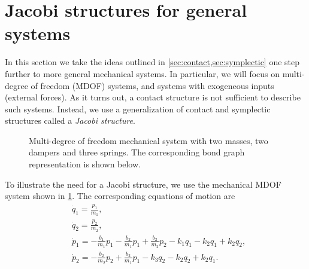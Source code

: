 \section{Jacobi structures for general systems}
\label{sec:jacobi}
In this section we take the ideas outlined in \cref{sec:contact,sec:symplectic} one step further to more general mechanical systems. In particular, we will focus on multi-degree of freedom (MDOF) systems, and systems with exogeneous inputs (external forces). As it turns out, a contact structure is not sufficient to describe such systems. Instead, we use a generalization of contact and symplectic structures called a \emph{Jacobi structure}.

\begin{figure}[ht!]
    \centering
    
    \caption{Multi-degree of freedom mechanical system with two masses, two dampers and three springs. The corresponding bond graph representation is shown below.}
    \label{fig:mdof_oscillator}
\end{figure}

To illustrate the need for a Jacobi structure, we use the mechanical MDOF system shown in \cref{fig:mdof_oscillator}. The corresponding equations of motion are
\begin{equation}
    \begin{split}
        &\dot{q}_1 = \frac{p_1}{m_1}, \\
        &\dot{q}_2 = \frac{p_2}{m_2}, \\
        &\dot{p}_1 = -\frac{b_1}{m_1}p_1 - \frac{b_2}{m_1}p_1 + \frac{b_2}{m_2}p_2 - k_1 q_1 - k_2 q_1 + k_2 q_2, \\
        &\dot{p}_2 =  - \frac{b_2}{m_2}p_2 + \frac{b_2}{m_1}p_1 - k_3 q_2 - k_2 q_2 + k_2 q_1. \\
    \end{split}
\end{equation}

